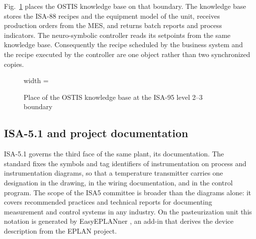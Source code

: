 Fig.~\ref{fig:yura_isa95_levels} places the OSTIS knowledge base on that
boundary. The knowledge base stores the ISA-88 recipes and the equipment model
of the unit, receives production orders from the MES, and returns batch reports
and process indicators. The neuro-symbolic controller reads its setpoints from
the same knowledge base. Consequently the recipe scheduled by the business
system and the recipe executed by the controller are one object rather than two
synchronized copies.

\begin{figure}[ht]
  \centering
  \begin{adjustbox}{width = \columnwidth}
  \end{adjustbox}
  \caption{Place of the OSTIS knowledge base at the ISA-95 level 2--3 boundary}
  \label{fig:yura_isa95_levels}
\end{figure}

\subsection{ISA-5.1 and project documentation}

ISA-5.1 \cite{ISA_5_1} governs the third face of the same plant, its
documentation. The standard fixes the symbols and tag identifiers of
instrumentation on process and instrumentation diagrams, so that a temperature
transmitter carries one designation in the drawing, in the wiring documentation,
and in the control program. The scope of the ISA5 committee is broader than the
diagrams alone: it covers recommended practices and technical reports for
documenting measurement and control systems in any industry. On the
pasteurization unit this notation is generated by EasyEPLANner
\cite{EasyEPLANner}, an add-in that derives the device description from the
EPLAN project.

